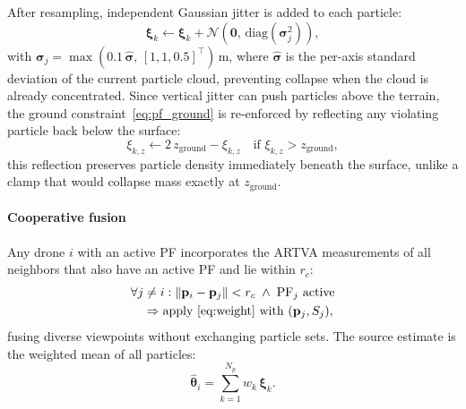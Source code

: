 \documentclass[journal,10pt,twocolumn]{IEEEtran}
\begin{document}
After resampling, independent Gaussian jitter is added to each particle:
\begin{equation}
  \bm{\xi}_k \leftarrow \bm{\xi}_k +
  \mathcal{N}(\mathbf{0},\,\mathrm{diag}(\bm{\sigma}_j^2)),
  \label{eq:pf_jitter}
\end{equation}
with $\bm{\sigma}_j = \max(0.1\,\hat{\bm{\sigma}},\,[1,1,0.5]^{\top})$\,m,
where $\hat{\bm{\sigma}}$ is the per-axis standard deviation of the current
particle cloud, preventing collapse when the cloud is already concentrated.
Since vertical jitter can push particles above the terrain, the ground
constraint~\eqref{eq:pf_ground} is re-enforced by reflecting any violating
particle back below the surface:
\begin{equation}
  \xi_{k,z} \leftarrow 2\,z_{\text{ground}} - \xi_{k,z}
  \quad \text{if } \xi_{k,z} > z_{\text{ground}},
  \label{eq:pf_reflect}
\end{equation}
this reflection preserves particle density immediately beneath the surface, unlike
a clamp that would collapse mass exactly at $z_{\text{ground}}$.

\paragraph{Cooperative fusion}
Any drone $i$ with an active PF incorporates the ARTVA measurements of
all neighbors that also have an active PF and lie within $r_c$:
\begin{equation}
  \begin{aligned}
    &\forall j \neq i : \|\mathbf{p}_i - \mathbf{p}_j\| < r_c
    \;\wedge\; \mathrm{PF}_j \text{ active} \\
    &\quad\Rightarrow \text{apply \eqref{eq:weight} with }
    (\mathbf{p}_j, S_j),
  \end{aligned}
  \label{eq:pf_fusion}
\end{equation}
fusing diverse viewpoints without exchanging particle sets.  The source
estimate is the weighted mean of all particles:
\begin{equation}
  \hat{\bm{\theta}}_i = \sum_{k=1}^{N_p} w_k\,\bm{\xi}_k.
  \label{eq:pf_estimate}
\end{equation}
\end{document}
